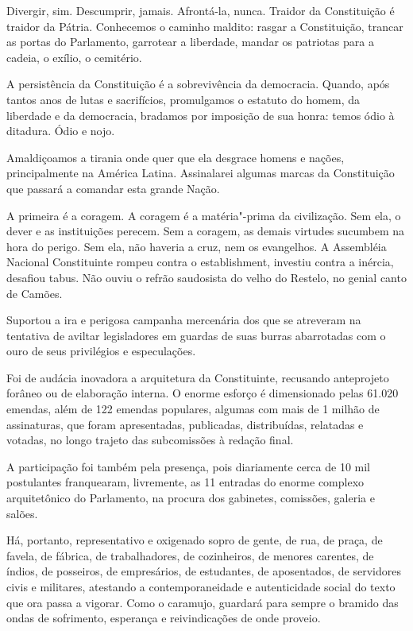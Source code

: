 Divergir, sim. Descumprir, jamais. Afrontá-la, nunca. Traidor da
Constituição é traidor da Pátria. Conhecemos o caminho maldito: rasgar a
Constituição, trancar as portas do Parlamento, garrotear a liberdade,
mandar os patriotas para a cadeia, o exílio, o cemitério.

A persistência da Constituição é a sobrevivência da democracia. Quando,
após tantos anos de lutas e sacrifícios, promulgamos o estatuto do
homem, da liberdade e da democracia, bradamos por imposição de sua
honra: temos ódio à ditadura. Ódio e nojo.

Amaldiçoamos a tirania onde quer que ela desgrace homens e nações,
principalmente na América Latina. Assinalarei algumas marcas da
Constituição que passará a comandar esta grande Nação.

A primeira é a coragem. A coragem é a matéria"-prima da civilização. Sem
ela, o dever e as instituições perecem. Sem a coragem, as demais
virtudes sucumbem na hora do perigo. Sem ela, não haveria a cruz, nem os
evangelhos. A Assembléia Nacional Constituinte rompeu contra o
establishment, investiu contra a inércia, desafiou tabus. Não ouviu o
refrão saudosista do velho do Restelo, no genial canto de Camões.

Suportou a ira e perigosa campanha mercenária dos que se atreveram na
tentativa de aviltar legisladores em guardas de suas burras abarrotadas
com o ouro de seus privilégios e especulações.

Foi de audácia inovadora a arquitetura da Constituinte, recusando
anteprojeto forâneo ou de elaboração interna. O enorme esforço é
dimensionado pelas 61.020 emendas, além de 122 emendas populares,
algumas com mais de 1 milhão de assinaturas, que foram apresentadas,
publicadas, distribuídas, relatadas e votadas, no longo trajeto das
subcomissões à redação final.

A participação foi também pela presença, pois diariamente cerca de 10
mil postulantes franquearam, livremente, as 11 entradas do enorme
complexo arquitetônico do Parlamento, na procura dos gabinetes,
comissões, galeria e salões.

Há, portanto, representativo e oxigenado sopro de gente, de rua, de
praça, de favela, de fábrica, de trabalhadores, de cozinheiros, de
menores carentes, de índios, de posseiros, de empresários, de
estudantes, de aposentados, de servidores civis e militares, atestando a
contemporaneidade e autenticidade social do texto que ora passa a
vigorar. Como o caramujo, guardará para sempre o bramido das ondas de
sofrimento, esperança e reivindicações de onde proveio.

